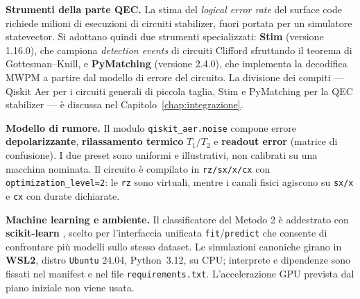 \begin{onehalfspace}
\textbf{Strumenti della parte QEC.} La stima del \textit{logical error rate} del surface code richiede milioni di esecuzioni di circuiti stabilizer, fuori portata per un simulatore statevector. Si adottano quindi due strumenti specializzati: \textbf{Stim} \cite{stim2021} (versione 1.16.0), che campiona \textit{detection events} di circuiti Clifford sfruttando il teorema di Gottesman--Knill, e \textbf{PyMatching} \cite{pymatching2021} (versione 2.4.0), che implementa la decodifica \ac{MWPM} a partire dal modello di errore del circuito. La divisione dei compiti --- Qiskit Aer per i circuiti generali di piccola taglia, Stim e PyMatching per la \ac{QEC} stabilizer --- è discussa nel Capitolo~\ref{chap:integrazione}.

\textbf{Modello di rumore.} Il modulo \texttt{qiskit\_aer.noise} compone errore \textbf{depolarizzante}, \textbf{rilassamento termico} $T_1/T_2$ e \textbf{readout error} (matrice di confusione). I due preset sono uniformi e illustrativi, non calibrati su una macchina nominata. Il circuito è compilato in \texttt{rz/sx/x/cx} con \texttt{optimization\_level=2}: le \texttt{rz} sono virtuali, mentre i canali fisici agiscono su \texttt{sx/x} e \texttt{cx} con durate dichiarate.

\textbf{Machine learning e ambiente.} Il classificatore del Metodo 2 è addestrato con \textbf{scikit-learn} \cite{scikit_learn}, scelto per l'interfaccia unificata \texttt{fit}/\texttt{predict} che consente di confrontare più modelli sullo stesso dataset. Le simulazioni canoniche girano in \textbf{WSL2}, distro \texttt{Ubuntu} 24.04, Python~3.12, su \ac{CPU}; interprete e dipendenze sono fissati nel manifest e nel file \texttt{requirements.txt}. L'accelerazione \ac{GPU} prevista dal piano iniziale non viene usata.

\end{onehalfspace}
